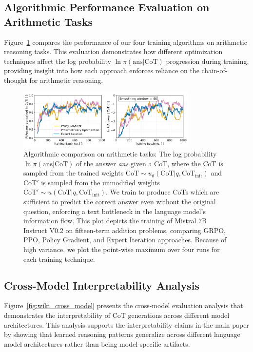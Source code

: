 \documentclass{article}
\begin{document}
\subsection{Algorithmic Performance Evaluation on Arithmetic Tasks}
Figure~\ref{fig:cot_arithmetic_performance} compares the performance of our four training algorithms on arithmetic reasoning tasks. This evaluation demonstrates how different optimization techniques affect the log probability $\ln \pi(\text{ans} | \text{CoT})$ progression during training, providing insight into how each approach enforces reliance on the chain-of-thought for arithmetic reasoning.

\begin{figure}[ht]
    \centering
    \includegraphics[width=0.8\textwidth]{Figures/cot_performance_comparison.png}
    \caption{Algorithmic comparison on arithmetic tasks: The log probability $\ln \pi(\text{ans} | \text{CoT})$ of the answer \textit{ans} given a CoT, where the CoT is sampled from the trained weights $\text{CoT} \sim u_\theta(\text{CoT} | q, \text{CoT}_{\text{init}})$ and $\text{CoT}'$ is sampled from the unmodified weights $\text{CoT}' \sim u(\text{CoT} | q, \text{CoT}_{\text{init}})$. We train to produce CoTs which are sufficient to predict the correct answer even without the original question, enforcing a text bottleneck in the language model's information flow. This plot depicts the training of Mistral 7B Instruct V0.2 on fifteen-term addition problems, comparing GRPO, PPO, Policy Gradient, and Expert Iteration approaches. Because of high variance, we plot the point-wise maximum over four runs for each training technique.}
    \label{fig:cot_arithmetic_performance}
\end{figure}

\subsection{Cross-Model Interpretability Analysis}
Figure~\ref{fig:wiki_cross_model} presents the cross-model evaluation analysis that demonstrates the interpretability of CoT generations across different model architectures. This analysis supports the interpretability claims in the main paper by showing that learned reasoning patterns generalize across different language model architectures rather than being model-specific artifacts.
\end{document}

